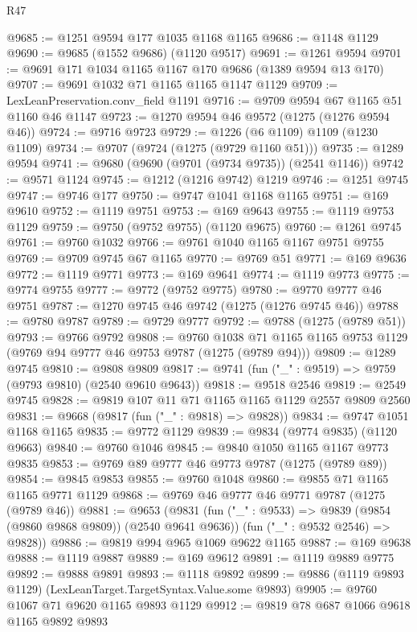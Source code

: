 \begin{lexlean}{R47}
\begin{coremodule}
@9685 := @1251 @9594 @177 @1035 @1168 @1165
@9686 := @1148 @1129
@9690 := @9685 (@1552 @9686) (@1120 @9517)
@9691 := @1261 @9594
@9701 := @9691 @171 @1034 @1165 @1167 @170 @9686 (@1389 @9594 @13 @170)
@9707 := @9691 @1032 @71 @1165 @1165 @1147 @1129
@9709 := LexLeanPreservation.conv_field @1191
@9716 := @9709 @9594 @67 @1165 @51 @1160 @46 @1147
@9723 := @1270 @9594 @46 @9572 (@1275 (@1276 @9594 @46))
@9724 := @9716 @9723
@9729 := @1226 (@6 @1109) @1109 (@1230 @1109)
@9734 := @9707 (@9724 (@1275 (@9729 @1160 @51)))
@9735 := @1289 @9594
@9741 := @9680 (@9690 (@9701 (@9734 @9735)) (@2541 @1146))
@9742 := @9571 @1124
@9745 := @1212 (@1216 @9742) @1219
@9746 := @1251 @9745
@9747 := @9746 @177
@9750 := @9747 @1041 @1168 @1165
@9751 := @169 @9610
@9752 := @1119 @9751
@9753 := @169 @9643
@9755 := @1119 @9753 @1129
@9759 := @9750 (@9752 @9755) (@1120 @9675)
@9760 := @1261 @9745
@9761 := @9760 @1032
@9766 := @9761 @1040 @1165 @1167 @9751 @9755
@9769 := @9709 @9745 @67 @1165
@9770 := @9769 @51
@9771 := @169 @9636
@9772 := @1119 @9771
@9773 := @169 @9641
@9774 := @1119 @9773
@9775 := @9774 @9755
@9777 := @9772 (@9752 @9775)
@9780 := @9770 @9777 @46 @9751
@9787 := @1270 @9745 @46 @9742 (@1275 (@1276 @9745 @46))
@9788 := @9780 @9787
@9789 := @9729 @9777
@9792 := @9788 (@1275 (@9789 @51))
@9793 := @9766 @9792
@9808 := @9760
    @1038
    @71
    @1165
    @1165
    @9753
    @1129
    (@9769 @94 @9777 @46 @9753 @9787 (@1275 (@9789 @94)))
@9809 := @1289 @9745
@9810 := @9808 @9809
@9817 := @9741 (fun ("_" : @9519) => @9759 (@9793 @9810) (@2540 @9610 @9643))
@9818 := @9518 @2546
@9819 := @2549 @9745
@9828 := @9819 @107 @11 @71 @1165 @1165 @1129 @2557 @9809 @2560
@9831 := @9668 (@9817 (fun ("_" : @9818) => @9828))
@9834 := @9747 @1051 @1168 @1165
@9835 := @9772 @1129
@9839 := @9834 (@9774 @9835) (@1120 @9663)
@9840 := @9760 @1046
@9845 := @9840 @1050 @1165 @1167 @9773 @9835
@9853 := @9769 @89 @9777 @46 @9773 @9787 (@1275 (@9789 @89))
@9854 := @9845 @9853
@9855 := @9760 @1048
@9860 := @9855 @71 @1165 @1165 @9771 @1129
@9868 := @9769 @46 @9777 @46 @9771 @9787 (@1275 (@9789 @46))
@9881 := @9653
    (@9831
      (fun ("_" : @9533) => @9839 (@9854 (@9860 @9868 @9809)) (@2540 @9641 @9636))
      (fun ("_" : @9532 @2546) => @9828))
@9886 := @9819 @994 @965 @1069 @9622 @1165
@9887 := @169 @9638
@9888 := @1119 @9887
@9889 := @169 @9612
@9891 := @1119 @9889 @9775
@9892 := @9888 @9891
@9893 := @1118 @9892
@9899 := @9886 (@1119 @9893 @1129) (LexLeanTarget.TargetSyntax.Value.some @9893)
@9905 := @9760 @1067 @71 @9620 @1165 @9893 @1129
@9912 := @9819 @78 @687 @1066 @9618 @1165 @9892 @9893

\end{coremodule}
\end{lexlean}
